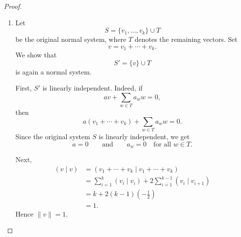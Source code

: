 \begin{proof}
\begin{enumerate}
              Consider
              \[
                  u
                  =
                  v_i
                  -
                  \sum_{s=1}^l (v_i\mid v_{j_s})v_{j_s}.
              \]
              Since the vectors in a normal system are linearly independent, we have
              \(u\neq 0\). Hence
              \[
                  (u\mid u)>0.
              \]
              Since \(v_{j_1},\dots,v_{j_l}\) are pairwise orthogonal and have norm
              \(1\), we get
              \[
                  \begin{aligned}
                      (u\mid u)
                       & =
                      (v_i\mid v_i)
                      -
                      \sum_{s=1}^l (v_i\mid v_{j_s})^2 \\
                       & =
                      1-\frac{1}{4}\sum_{s=1}^l k_s.
                  \end{aligned}
              \]
              Therefore
              \[
                  \sum_{s=1}^l k_s<4.
              \]
              Hence the total number of edges adjacent to \(v_i\) is strictly less than
              \(4\).

        \item Let
              \[
                  S=\{v_1,\dots,v_k\}\cup T
              \]
              be the original normal system, where \(T\) denotes the remaining vectors.
              Set
              \[
                  v=v_1+\cdots+v_k.
              \]
              We show that
              \[
                  S'=\{v\}\cup T
              \]
              is again a normal system.

              First, \(S'\) is linearly independent. Indeed, if
              \[
                  av+\sum_{w\in T}a_w w=0,
              \]
              then
              \[
                  a(v_1+\cdots+v_k)+\sum_{w\in T}a_w w=0.
              \]
              Since the original system \(S\) is linearly independent, we get
              \[
                  a=0
                  \qquad\text{and}\qquad
                  a_w=0
                  \quad\text{for all }w\in T.
              \]

              Next,
              \[
                  \begin{aligned}
                      (v\mid v)
                       & =
                      \left(v_1+\cdots+v_k\mid v_1+\cdots+v_k\right) \\
                       & =
                      \sum_{i=1}^k (v_i\mid v_i)
                      +
                      2\sum_{i=1}^{k-1}(v_i\mid v_{i+1})             \\
                       & =
                      k+2(k-1)\left(-\frac{1}{2}\right)              \\
                       & =1.
                  \end{aligned}
              \]
              Hence \(\|v\|=1\).


\end{enumerate}
\end{proof}
